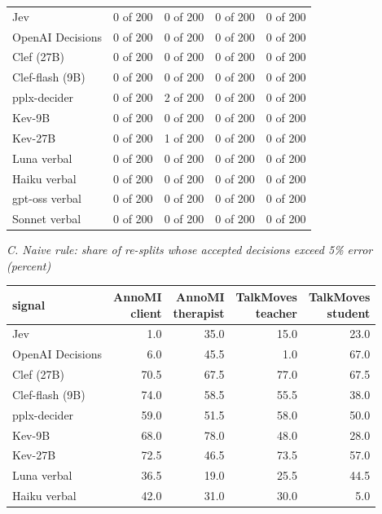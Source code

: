 \begin{table}[t]
\begin{adjustbox}{max width=\linewidth}
\begin{tabular}{lllll}
\midrule
Jev & 0 of 200 & 0 of 200 & 0 of 200 & 0 of 200 \\
OpenAI Decisions & 0 of 200 & 0 of 200 & 0 of 200 & 0 of 200 \\
Clef (27B) & 0 of 200 & 0 of 200 & 0 of 200 & 0 of 200 \\
Clef-flash (9B) & 0 of 200 & 0 of 200 & 0 of 200 & 0 of 200 \\
pplx-decider & 0 of 200 & 2 of 200 & 0 of 200 & 0 of 200 \\
Kev-9B & 0 of 200 & 0 of 200 & 0 of 200 & 0 of 200 \\
Kev-27B & 0 of 200 & 1 of 200 & 0 of 200 & 0 of 200 \\
Luna verbal & 0 of 200 & 0 of 200 & 0 of 200 & 0 of 200 \\
Haiku verbal & 0 of 200 & 0 of 200 & 0 of 200 & 0 of 200 \\
gpt-oss verbal & 0 of 200 & 0 of 200 & 0 of 200 & 0 of 200 \\
Sonnet verbal & 0 of 200 & 0 of 200 & 0 of 200 & 0 of 200 \\
\bottomrule
\end{tabular}
\end{adjustbox}
\medskip
\par\textit{C. Naive rule: share of re-splits whose accepted decisions exceed 5\% error (percent)}\par\smallskip
\begin{adjustbox}{max width=\linewidth}
\begin{tabular}{lrrrr}
\toprule
signal & \makecell[br]{AnnoMI \\{} client} & \makecell[br]{AnnoMI \\{} therapist} & \makecell[br]{TalkMoves \\{} teacher} & \makecell[br]{TalkMoves \\{} student} \\
\midrule
Jev & 1.0 & 35.0 & 15.0 & 23.0 \\
OpenAI Decisions & 6.0 & 45.5 & 1.0 & 67.0 \\
Clef (27B) & 70.5 & 67.5 & 77.0 & 67.5 \\
Clef-flash (9B) & 74.0 & 58.5 & 55.5 & 38.0 \\
pplx-decider & 59.0 & 51.5 & 58.0 & 50.0 \\
Kev-9B & 68.0 & 78.0 & 48.0 & 28.0 \\
Kev-27B & 72.5 & 46.5 & 73.5 & 57.0 \\
Luna verbal & 36.5 & 19.0 & 25.5 & 44.5 \\
Haiku verbal & 42.0 & 31.0 & 30.0 & 5.0 \\

\end{tabular}
\end{adjustbox}
\end{table}
